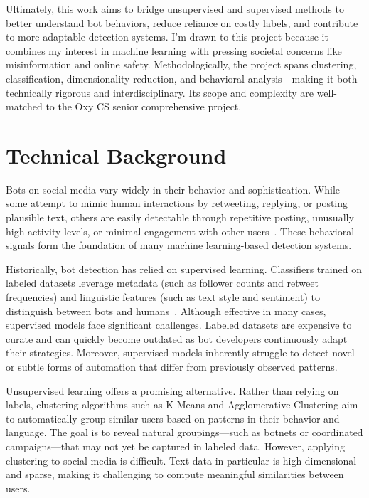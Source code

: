 \documentclass[10pt,twocolumn]{article}
\begin{document}
Ultimately, this work aims to bridge unsupervised and supervised methods to better understand bot behaviors, reduce reliance on costly labels, and contribute to more adaptable detection systems. I’m drawn to this project because it combines my interest in machine learning with pressing societal concerns like misinformation and online safety. Methodologically, the project spans clustering, classification, dimensionality reduction, and behavioral analysis—making it both technically rigorous and interdisciplinary. Its scope and complexity are well-matched to the Oxy CS senior comprehensive project.


\section{Technical Background}

Bots on social media vary widely in their behavior and sophistication. While some attempt to mimic human interactions by retweeting, replying, or posting plausible text, others are easily detectable through repetitive posting, unusually high activity levels, or minimal engagement with other users~\cite{ferrara2016rise,cresci2017paradigm}. These behavioral signals form the foundation of many machine learning-based detection systems.

Historically, bot detection has relied on supervised learning. Classifiers trained on labeled datasets leverage metadata (such as follower counts and retweet frequencies) and linguistic features (such as text style and sentiment) to distinguish between bots and humans~\cite{varol2017online}. Although effective in many cases, supervised models face significant challenges. Labeled datasets are expensive to curate and can quickly become outdated as bot developers continuously adapt their strategies. Moreover, supervised models inherently struggle to detect novel or subtle forms of automation that differ from previously observed patterns.

Unsupervised learning offers a promising alternative. Rather than relying on labels, clustering algorithms such as K-Means and Agglomerative Clustering aim to automatically group similar users based on patterns in their behavior and language. The goal is to reveal natural groupings—such as botnets or coordinated campaigns—that may not yet be captured in labeled data. However, applying clustering to social media is difficult. Text data in particular is high-dimensional and sparse, making it challenging to compute meaningful similarities between users. 
\end{document}

